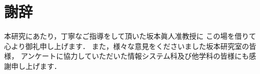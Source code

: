 \chapter*{謝辞}
\thispagestyle{fancy}
本研究にあたり，丁寧なご指導をして頂いた坂本眞人准教授に
この場を借りて心より御礼申し上げます．
また，様々な意見をくださいました坂本研究室の皆様，
アンケートに協力していただいた情報システム科及び他学科の皆様にも感謝申し上げます．